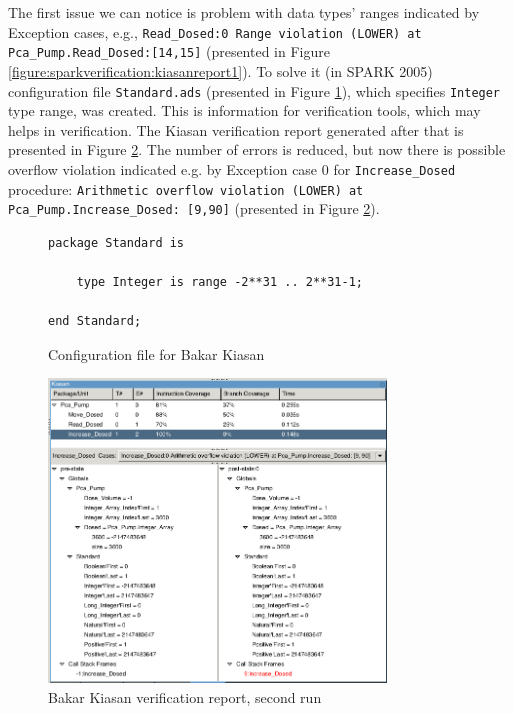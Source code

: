 The first issue we can notice is problem with data types' ranges indicated by Exception cases, e.g., \lstinline{Read_Dosed:0 Range violation (LOWER) at Pca_Pump.Read_Dosed:[14,15]} (presented in Figure \ref{figure:sparkverification:kiasanreport1}). To solve it (in SPARK 2005) configuration file \lstinline{Standard.ads} (presented in Figure \ref{figure:sparkverification:config}), which specifies \lstinline{Integer} type range, was created. This is information for verification tools, which may helps in verification. The Kiasan verification report generated after that is presented in Figure \ref{figure:sparkverification:kiasanreport2}. The number of errors is reduced, but now there is possible overflow violation indicated e.g. by Exception case 0 for \lstinline{Increase_Dosed} procedure: \lstinline{Arithmetic overflow violation (LOWER) at Pca_Pump.Increase_Dosed: [9,90]} (presented in Figure \ref{figure:sparkverification:kiasanreport2}).

\begin{figure}
\singlespacing
\begin{lstlisting}[frame=single, gobble=0]
package Standard is

    type Integer is range -2**31 .. 2**31-1;

end Standard;
\end{lstlisting}
\doublespacing
\caption{Configuration file for Bakar Kiasan}
\label{figure:sparkverification:config}
\end{figure}

\begin{figure}[ht]%
    \begin{center}
        \includegraphics[width=0.8\textwidth]{figures/pca-pump-verification-step2.png}        
    \end{center}
    \caption{Bakar Kiasan verification report, second run}
    \label{figure:sparkverification:kiasanreport2}
\end{figure}

